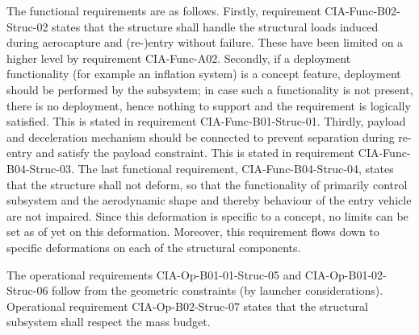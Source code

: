 The functional requirements are as follows. Firstly, requirement CIA-Func-B02-Struc-02 states that the structure shall handle the structural loads induced during aerocapture and (re-)entry without failure. These have been limited on a higher level by requirement CIA-Func-A02. Secondly, if a deployment functionality  (for example an inflation system) is a concept feature, deployment should be performed by the subsystem; in case such a functionality is not present, there is no deployment, hence nothing to support and the requirement is logically satisfied. This is stated in requirement CIA-Func-B01-Struc-01. Thirdly, payload and deceleration mechanism should be connected to prevent separation during re-entry and satisfy the payload constraint. This is stated in requirement CIA-Func-B04-Struc-03. The last functional requirement, CIA-Func-B04-Struc-04, states that the structure shall not deform, so that the functionality of primarily control subsystem and the aerodynamic shape and thereby behaviour of the entry vehicle are not impaired. Since this deformation is specific to a concept, no limits can be set as of yet on this deformation. Moreover, this requirement flows down to specific deformations on each of the structural components.

The operational requirements CIA-Op-B01-01-Struc-05 and CIA-Op-B01-02-Struc-06 follow from the geometric constraints (by launcher considerations). Operational requirement CIA-Op-B02-Struc-07 states that the structural subsystem shall respect the mass budget.